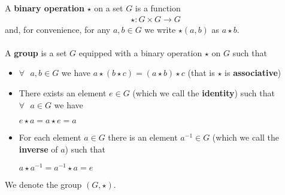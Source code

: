 \documentclass{article}
\begin{document}
  A \textbf{binary operation} $\star$ on a set $G$ is a function
  \begin{align*}
    \star: G \times G \to G
  \end{align*}
  and, for convenience, for any $a,b\in{G}$ we write $\star(a,b)$ as $a\star{b}$.
  \\\\A \textbf{group} is a set $G$ equipped with a binary operation $\star$ on $G$ such that
  \begin{itemize}
  \item $\forall\text{ }a,b\in{G}$ we have $a\star(b\star{c}) = (a\star{b})\star{c}$ (that is $\star$ is \textbf{associative})
  \item There exists an element $e\in{G}$ (which we call the \textbf{identity}) such that $\forall\text{ }a\in{G}$ we have
    \begin{center}
      $e\star{a}=a\star{e}=a$
    \end{center}
  \item For each element $a\in{G}$ there is an element $a^{-1}\in{G}$ (which we call the \textbf{inverse} of $a$) such that
    \begin{center}
      $a\star{a^{-1}}=a^{-1}\star{a}=e$
    \end{center}
  \end{itemize}
  We denote the group $(G, \star)$.
\end{document}
